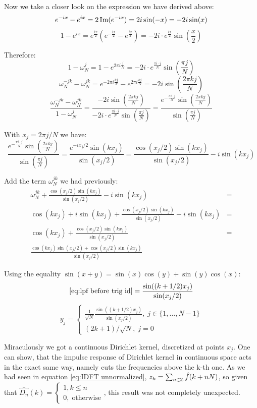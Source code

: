 Now we take a closer look on the expression we have derived above:
\[
	e^{-ix}-e^{ix} = 2\operatorname{Im}(e^{-ix}) = 2i\sin(-x) = -2i\sin(x)\]
\[
	1-e^{ix}
	= e^{\frac{ix}{2}}\left(e^{-\frac{ix}{2}} - e^{\frac{ix}{2}}\right)
	= -2i\cdot e^{\frac{ix}{2}} \sin \left(\frac{x}{2}\right)\]

Therefore:
\[
	1 - \omega_N^{j} = 1-e^{2\pi i\frac{j}{N}}
	= -2i\cdot e^{\frac{\pi i\cdot j}{N}} \sin \left(\frac{\pi j}{N}\right)\]
\[
	\omega_N^{-jk} - \omega_N^{jk}
	= e^{-2\pi i\frac{kj}{N}}-e^{2\pi i\frac{kj}{N}}
	= -2i \sin\left(\frac{2\pi kj}{N}\right)\]
\[
	\frac{\omega_N^{-jk} - \omega_N^{jk}}{1 - \omega_N^{j}}
	= \frac{-2i \sin\left(\frac{2\pi kj}{N}\right)}{-2i\cdot e^{\frac{\pi i\cdot j}{N}} \sin \left(\frac{\pi j}{N}\right)}
	= \frac{e^{-\frac{\pi i\cdot j}{N}} \sin\left(\frac{2\pi kj}{N}\right)}{\sin \left(\frac{\pi j}{N}\right)}\]

With $x_j = 2\pi j / N$ we have:
\[
	\frac{e^{-\frac{\pi i\cdot j}{N}} \sin\left(\frac{2\pi kj}{N}\right)}{\sin \left(\frac{\pi j}{N}\right)}
	= \frac{e^{-ix_j/2} \sin\left(kx_j\right)}{\sin \left(x_j/2\right)}
	= \frac{\cos(x_j/2) \sin(kx_j)}{\sin(x_j/2)} - i \sin\left(kx_j\right)\]

Add the term $\omega_N^{jk}$ we had previously:
\begin{equation}
	\begin{aligned}
		\omega_N^{jk} + \frac{\cos(x_j/2) \sin(kx_j)}{\sin(x_j/2)} - i \sin(kx_j)
		 & = \\ \cos(kx_j) + i \sin(kx_j) + \frac{\cos(x_j/2) \sin(kx_j)}{\sin(x_j/2)} - i \sin(kx_j)
		 & = \\ \cos(kx_j) + \frac{\cos(x_j/2) \sin(kx_j)}{\sin(x_j/2)}
		 & = \\ \frac{\cos(kx_j) \sin(x_j/2) + \cos(x_j/2) \sin(kx_j)}{\sin(x_j/2)}
	\end{aligned}
	\label{eq:lpf before trig id}
\end{equation}

Using the equality $\sin(x+y) = \sin(x)\cos(y) + \sin(y)\cos(x)$:
\[\eqref{eq:lpf before trig id} =\frac{\sin((k+1/2)x_j)}{\sin(x_j/2)}\]
\[y_j = \begin{cases}
		\frac{1}{\sqrt{N}}\frac{\sin((k+1/2)x_j)}{\sin(x_j/2)}, \;  j\in \{1, \dots, N-1\} \\
		(2k+1)/\sqrt{N}, \; j = 0
	\end{cases}\]

Miraculously we got a continuous Dirichlet kernel, discretized at points $x_j$. One can show, that the impulse response of Dirichlet kernel in continuous space acts in the exact same way, namely cuts the frequencies above the k-th one. As we had seen in equation \eqref{eq:IDFT unnormalized}, $z_k = \sum_{n \in \mathbb{Z}} \hat{f}(k+nN)$, so given that $\widehat{D_n}(k) = \begin{cases}
		1, k \leq n \\
		0, \; \text{otherwise}
	\end{cases}$, this result was not completely unexpected.